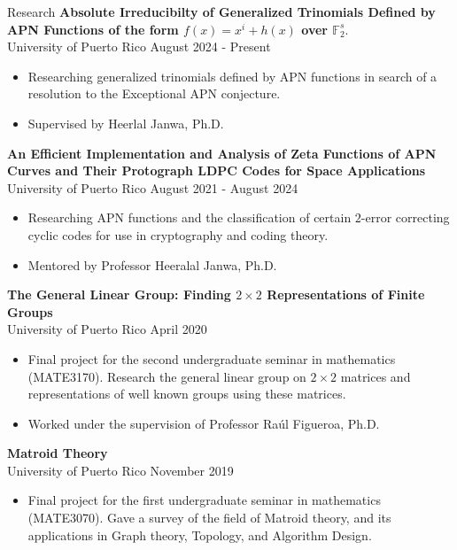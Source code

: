 \documentclass{resume} %
\begin{document}
\begin{rSection}{Research}
  \textbf{Absolute Irreducibilty of Generalized Trinomials Defined by
    APN Functions of the form $f(x)=x^i+h(x)$ over
    $\mathbb{F}_{2}^s$}.\\
    University of Puerto Rico \hfill{August 2024 - Present}
  \begin{itemize}
    \item Researching generalized trinomials defined by APN functions
      in search of a resolution to the Exceptional APN conjecture.

    \item Supervised by Heerlal Janwa, Ph.D.
  \end{itemize}
    \textbf{An Efficient Implementation and Analysis of Zeta Functions of APN Curves
and Their Protograph LDPC Codes for Space Applications} \\
    University of Puerto Rico \hfill{August 2021 - August 2024}
    \begin{itemize}
        \item Researching APN functions and the classification of certain
            $2$-error correcting cyclic codes for use in cryptography and coding
            theory.

        \item Mentored by Professor Heeralal Janwa, Ph.D.
    \end{itemize}

    \textbf{The General Linear Group: Finding $2 \times 2$
    Representations of Finite Groups} \\
    University of Puerto Rico \hfill{April 2020}
    \begin{itemize}
        \item Final project for the second undergraduate seminar in mathematics
            (MATE3170). Research the general linear group on $2 \times 2$
            matrices and representations of well known groups using these
            matrices.

        \item Worked under the supervision of Professor Ra\'ul Figueroa, Ph.D.
    \end{itemize}

    \textbf{Matroid Theory}  \\
    University of Puerto Rico \hfill{November 2019}
    \begin{itemize}
        \item Final project for the first undergraduate seminar in mathematics
            (MATE3070). Gave a survey of the field of Matroid theory, and its
            applications in Graph theory, Topology, and Algorithm Design.


\end{itemize}
\end{rSection}
\end{document}
